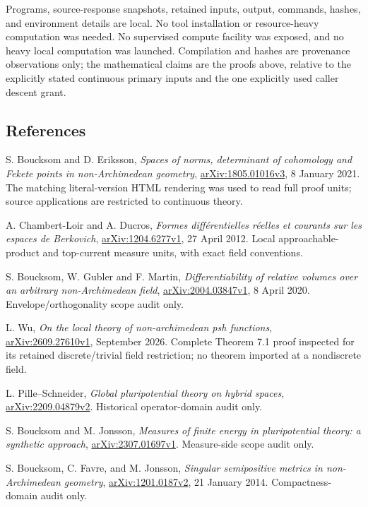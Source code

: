 \documentclass[
]{article}
\begin{document}
Programs, source-response snapshots, retained inputs, output, commands,
hashes, and environment details are local. No tool installation or
resource-heavy computation was needed. No supervised compute facility
was exposed, and no heavy local computation was launched. Compilation
and hashes are provenance observations only; the mathematical claims are
the proofs above, relative to the explicitly stated continuous primary
inputs and the one explicitly used caller descent grant.

\subsection{References}\label{references}

S. Boucksom and D. Eriksson, \emph{Spaces of norms, determinant of
cohomology and Fekete points in non-Archimedean geometry},
\href{https://arxiv.org/pdf/1805.01016v3}{arXiv:1805.01016v3}, 8 January
2021. The matching literal-version HTML rendering was used to read full
proof units; source applications are restricted to continuous theory.

A. Chambert-Loir and A. Ducros, \emph{Formes différentielles réelles et
courants sur les espaces de Berkovich},
\href{https://arxiv.org/pdf/1204.6277v1}{arXiv:1204.6277v1}, 27 April
2012. Local approachable-product and top-current measure units, with
exact field conventions.

S. Boucksom, W. Gubler and F. Martin, \emph{Differentiability of
relative volumes over an arbitrary non-Archimedean field},
\href{https://arxiv.org/pdf/2004.03847v1}{arXiv:2004.03847v1}, 8 April
2020. Envelope/orthogonality scope audit only.

L. Wu, \emph{On the local theory of non-archimedean psh functions},
\href{https://arxiv.org/pdf/2609.27610v1}{arXiv:2609.27610v1}, September
2026. Complete Theorem 7.1 proof inspected for its retained
discrete/trivial field restriction; no theorem imported at a nondiscrete
field.

L. Pille--Schneider, \emph{Global pluripotential theory on hybrid
spaces}, \href{https://arxiv.org/pdf/2209.04879v2}{arXiv:2209.04879v2}.
Historical operator-domain audit only.

S. Boucksom and M. Jonsson, \emph{Measures of finite energy in
pluripotential theory: a synthetic approach},
\href{https://arxiv.org/pdf/2307.01697v1}{arXiv:2307.01697v1}.
Measure-side scope audit only.

S. Boucksom, C. Favre, and M. Jonsson, \emph{Singular semipositive
metrics in non-Archimedean geometry},
\href{https://arxiv.org/pdf/1201.0187v2}{arXiv:1201.0187v2}, 21 January
2014. Compactness-domain audit only.
\end{document}
